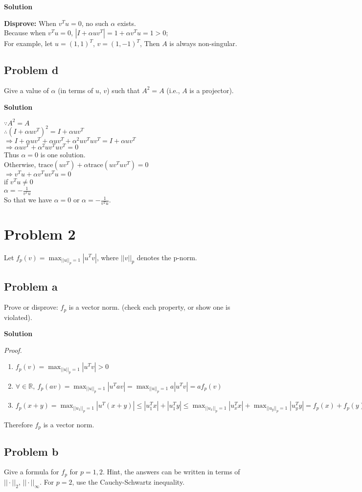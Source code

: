 \documentclass[12pt,oneside,a4paper]{article}
\newcommand{\problem}[1]
{
    \clearpage
    \section*{Problem {#1}}
}
\newcommand{\subproblem}[1]
{
    \subsection*{Problem {#1}}
}
\newcommand{\solution}
{
    \vspace{15pt}
    \noindent\ignorespaces\textbf{\large Solution}
}
\newcommand{\trace}{\mathrm{trace}}
\begin{document}
\solution

\textbf{Disprove:} When $v^{T}u = 0$, no such $\alpha$ exists. \\
Because when $v^{T}u = 0$, $|I + \alpha uv^{T}| = 1 + \alpha v^{T}u = 1 > 0$;\\
For example, let $u = (1, 1)^{T}$, $v = (1, -1)^{T}$, Then $A$ is always non-singular.

\subproblem{d}
Give a value of $\alpha$ (in terms of $u$, $v$) such that $A^2 = A$ (i.e., $A$ is a projector).

\solution

$\because A^2 = A$\\
$\therefore (I + \alpha uv^{T})^2 = I + \alpha uv^{T}$\\
$\Rightarrow I + \alpha uv^{T} + \alpha uv^{T} + \alpha^2 uv^{T}uv^{T} = I + \alpha uv^{T}$\\
$\Rightarrow \alpha uv^{T} + \alpha^2 uv^{T}uv^{T} = 0$\\
Thus $\alpha = 0$ is one solution.\\
Otherwise, $\trace(uv^{T}) + \alpha \trace(uv^{T}uv^{T}) = 0$\\
$\Rightarrow v^{T}u + \alpha v^{T}uv^{T}u = 0$\\
if $v^{T}u \neq 0$\\
$\alpha = -\frac{1}{v^{T}u}$\\
So that we have $\alpha = 0$ or $\alpha = -\frac{1}{v^{T}u}$.

\problem{2}
Let $f_{p}(v) = \max_{||u||_{p} = 1}|u^{T}v|$, where $||v||_{p}$ denotes the p-norm.

\subproblem{a}
Prove or disprove: $f_{p}$ is a vector norm. (check each property, or show one is violated).

\solution

\emph{Proof.}
\begin{enumerate}
    \item $f_{p}(v) = \max_{||u||_{p} = 1}|u^{T}v| > 0$
    \item $\forall \in \mathbb{R},~f_{p}(av) = \max_{||u||_{p} = 1}|u^{T}av| = \max_{||u||_{p} = 1}a|u^{T}v| = af_{p}(v)$
    \item $f_{p}(x + y) = \max_{||u_{1}||_{p} = 1}|u^{T} (x + y)| \leq |u_{1}^{T}x| + |u_{1}^{T}y| \leq \max_{||u_{x}||_{p} = 1}|u_{x}^{T}x| + \max_{||u_{y}||_{p} = 1}|u_{y}^{T}y| = f_{p}(x) + f_{p}(y)$
\end{enumerate}

Therefore $f_{p}$ is a vector norm.

\subproblem{b}
Give a formula for $f_{p}$ for $p = 1,2$. Hint, the answers can be written in terms of $||\cdot||_{2}$, $||\cdot||_{\infty}$. For $p = 2$, use the Cauchy-Schwartz inequality.
\end{document}
